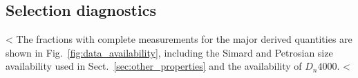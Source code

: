 \documentclass{aa}
\newcommand{\CG}{CG\textsubscript{4}}
\begin{document}
\begin{appendix}
\subsection{Selection diagnostics}\label{app:selection}
<%
The fractions with complete measurements for the major derived quantities are shown in Fig.~\ref{fig:data_availability}, including the Simard and Petrosian size availability used in Sect.~\ref{sec:other_properties} and the availability of \(D_n4000\). <%



\end{appendix}
\end{document}
